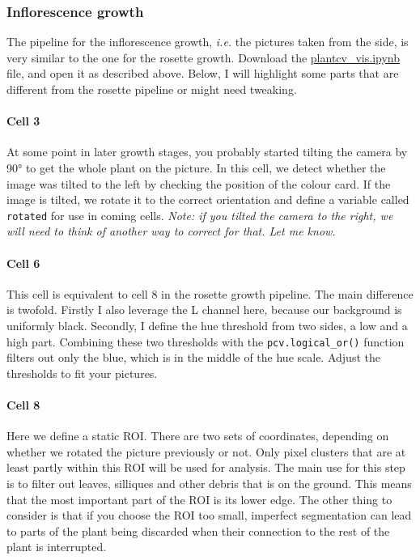 \documentclass[10pt]{article}
\begin{document}
\subsubsection{Inflorescence growth}

The pipeline for the inflorescence growth, \textit{i.e.} the pictures taken from the side, is very similar to the one for the rosette growth. Download the \href{https://github.com/leonardblaschek/plantcv/blob/master/plantcv_vis.ipynb}{plantcv\_vis.ipynb} file, and open it as described above. Below, I will highlight some parts that are different from the rosette pipeline or might need tweaking.

\paragraph*{Cell 3} At some point in later growth stages, you probably started tilting the camera by 90° to get the whole plant on the picture. In this cell, we detect whether the image was tilted to the left by checking the position of the colour card. If the image is tilted, we rotate it to the correct orientation and define a variable called \texttt{rotated} for use in coming cells. \textit{Note: if you tilted the camera to the right, we will need to think of another way to correct for that. Let me know.}

\paragraph*{Cell 6} This cell is equivalent to cell 8 in the rosette growth pipeline. The main difference is twofold. Firstly I also leverage the L channel here, because our background is uniformly black. Secondly, I define the hue threshold from two sides, a low and a high part. Combining these two thresholds with the \texttt{pcv.logical\_or()} function filters out only the blue, which is in the middle of the hue scale. Adjust the thresholds to fit your pictures.

\paragraph*{Cell 8} Here we define a static ROI. There are two sets of coordinates, depending on whether we rotated the picture previously or not. Only pixel clusters that are at least partly within this ROI will be used for analysis. The main use for this step is to filter out leaves, silliques and other debris that is on the ground. This means that the most important part of the ROI is its lower edge. The other thing to consider is that if you choose the ROI too small, imperfect segmentation can lead to parts of the plant being discarded when their connection to the rest of the plant is interrupted.
\end{document}

